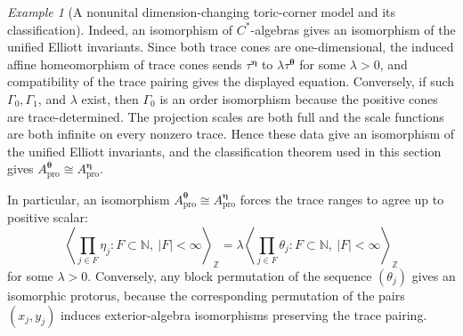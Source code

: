\documentclass[11pt]{amsart}
\theoremstyle{definition}
\theoremstyle{remark}
\newtheorem{example}[theorem]{Example}
\newcommand{\Z}{\mathbb{Z}}
\newcommand{\N}{\mathbb N}
\newcommand{\ex}{\mathrm{pro}}
\begin{document}
\begin{example}[A nonunital dimension-changing toric-corner model and its classification]
Indeed, an isomorphism of $C^*$-algebras gives an isomorphism of the unified
Elliott invariants. Since both trace cones are one-dimensional, the induced
affine homeomorphism of trace cones sends
$\tau^{\boldsymbol\eta}$ to
$\lambda\tau^{\boldsymbol\theta}$
for some $\lambda>0$, and compatibility of the trace pairing gives the
displayed equation. Conversely, if such $\Gamma_0,\Gamma_1$, and $\lambda$
exist, then $\Gamma_0$ is an order isomorphism because the positive cones are
trace-determined. The projection scales are both full and the scale functions
are both infinite on every nonzero trace. Hence these data give an isomorphism
of the unified Elliott invariants, and the classification theorem used in this
section gives $A_{\ex}^{\boldsymbol\theta}\cong A_{\ex}^{\boldsymbol\eta}.$

In particular, an isomorphism $A_{\ex}^{\boldsymbol\theta}\cong A_{\ex}^{\boldsymbol\eta}$
forces the trace ranges to agree up to positive scalar:
\[
\left\langle
\prod_{j\in F}\eta_j:
F\subset\N,\ |F|<\infty
\right\rangle_{\Z}
=
\lambda
\left\langle
\prod_{j\in F}\theta_j:
F\subset\N,\ |F|<\infty
\right\rangle_{\Z}
\]
for some $\lambda>0$. Conversely, any block permutation of the sequence
$(\theta_j)$ gives an isomorphic protorus, because the corresponding
permutation of the pairs $(x_j,y_j)$ induces exterior-algebra isomorphisms
preserving the trace pairing.
\end{example}
\end{document}
